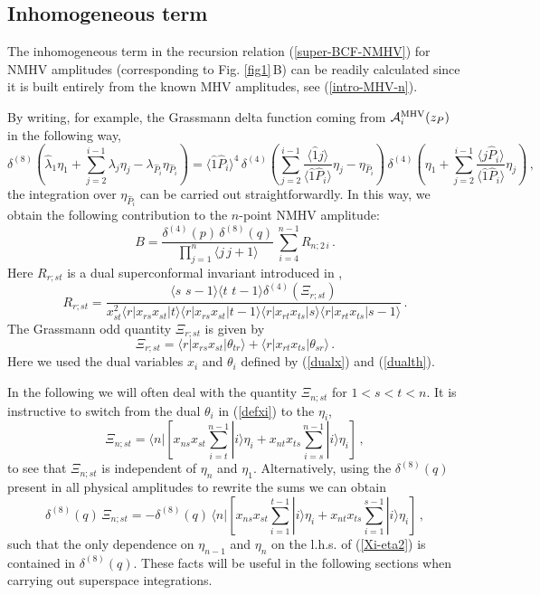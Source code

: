 \documentclass[12pt]{article}
\def \be  {\begin{equation}}
\def \ee  {\end{equation}}
\newcommand \vev [1] {\langle{#1}\rangle}
\def\l<{\langle}\def\r>{\rangle}
\begin{document}
\subsection{Inhomogeneous term}
\label{subsect-inhom}
The inhomogeneous term in the recursion relation
(\ref{super-BCF-NMHV}) for NMHV amplitudes (corresponding to Fig.
\ref{fig1}\,B) can be readily calculated since it is built
entirely from the known MHV amplitudes, see (\ref{intro-MHV-n}).

By writing, for example, the Grassmann delta function coming from
$\mathcal{A}_{i}^{\rm MHV}(z_{P})$ in the following way,
\be
\delta^{(8)}\left(\hat{\lambda}_{1} \eta_{1} + \sum_{j=2}^{i-1}
\lambda_{j} \eta_{j} - \lambda_{\hat{P}_{i}}
\eta_{\hat{P}_{i}}\right) = \vev{\hat{1} \hat{P}_{i}}^4 \,
\delta^{(4)}\left(\sum_{j=2}^{i-1} \frac{\vev{\hat{1}
{j}}}{\vev{\hat{1}\hat{P}_{i} }} \eta_{j} - \eta_{\hat{P}_{i}}
\right)\, \delta^{(4)}\left(\eta_{1} + \sum_{j=2}^{i-1}
\frac{\vev{j \hat{P}_{i}}}{\vev{\hat{1}\hat{P}_{i} }} \eta_{j}
\right)\,,
\ee
the integration over $\eta_{\hat{P}_{i}}$ can be
carried out straightforwardly. In this way, we obtain the
following contribution to the $n$-point NMHV amplitude:
\be
\label{B-result}
B = \frac{ \delta^{(4)}(p) \,
\delta^{(8)}(q)}{\prod_{j=1}^{n} \langle j \, j+1 \rangle } \,
\sum_{i=4}^{n-1} R_{n;2\,i} \,.
\ee
Here $R_{r;st}$ is
a dual superconformal invariant introduced in \cite{dhks5},
\be
\label{def-Rrst} R_{r;st} = \frac{\l<s
\,\, s-1\r> \l<t \,\, t-1\r>
\delta^{(4)}(\Xi_{r;st})}{x_{st}^2\l<r|x_{rs}x_{st}|t\r>\l<r|x_{rs}x_{st}|t-1\r>\l<r|x_{rt}x_{ts}|s\r>\l<r|x_{rt}x_{ts}|s-1\r>}\,.
\ee
The Grassmann odd quantity $\Xi_{r;st}$ is given by \be\label{defxi}
\Xi_{r;st} = \l<r|x_{rs}x_{st}|\theta_{tr}\r> +
\l<r|x_{rt}x_{ts}|\theta_{sr}\r>\,. \ee Here we used the dual
variables $x_{i}$ and $\theta_{i}$ defined by (\ref{dualx}) and (\ref{dualth}).

In the following we will often deal with the quantity $\Xi_{n;st}$ for $1< s<t < n$.
It is instructive to switch from the dual $\theta_i$ in (\ref{defxi}) to the $\eta_i$,
\be
\label{Xi-eta1}
\Xi_{n;st} = \langle n| \left\lbrack x_{ns} x_{st} \sum_{i=t}^{n-1} |i\rangle \eta_{i}+ x_{nt} x_{ts} \sum_{i=s}^{n-1} |i\rangle \eta_{i} \right\rbrack \,,
\ee
to see that $\Xi_{n;st}$ is independent of $\eta_{n}$ and $\eta_{1}$. Alternatively, using
the $\delta^{(8)}(q)$ present in all physical amplitudes to rewrite the sums we can obtain
\be
\label{Xi-eta2}
\delta^{(8)}(q)\,\Xi_{n;st} =- \delta^{(8)}(q)\, \langle n| \left\lbrack x_{ns} x_{st} \sum_{i=1}^{t-1} |i\rangle \eta_{i}+ x_{nt} x_{ts} \sum_{i=1}^{s-1} |i\rangle \eta_{i} \right\rbrack \,,
\ee
such that the only dependence on $\eta_{n-1}$ and $\eta_{n}$ on the l.h.s. of (\ref{Xi-eta2}) is contained in $\delta^{(8)}(q)$.
These facts will be useful in the following sections when carrying out superspace integrations.
\end{document}
